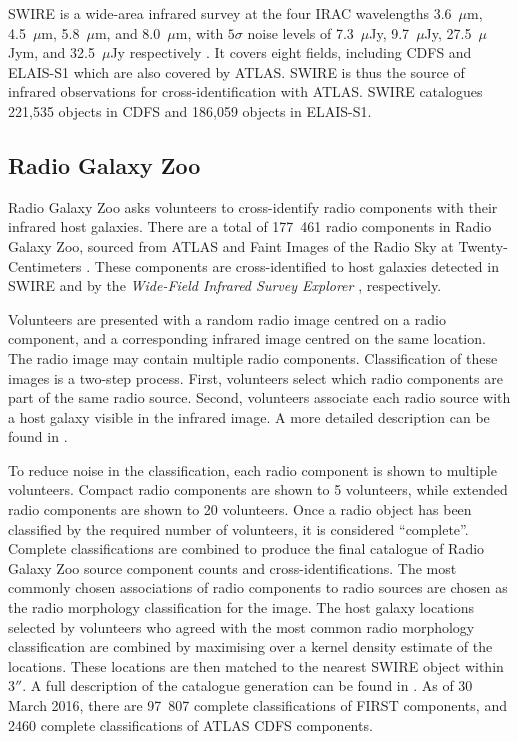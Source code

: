 \documentclass[fleqn,usenatbib,usedcolumn]{mnras}
\begin{document}
    SWIRE \citep{lonsdale03swire, surace05swire} is a wide-area infrared survey
    at the four IRAC wavelengths 3.6~$\mu$m, 4.5~$\mu$m, 5.8~$\mu$m, and
    8.0~$\mu$m, with $5\sigma$ noise levels of 7.3~$\mu$Jy, 9.7~$\mu$Jy,
    27.5~$\mu$Jym, and 32.5~$\mu$Jy respectively \citep{lonsdale03swire}. It
    covers eight fields, including CDFS and ELAIS-S1 which are also covered by
    ATLAS. SWIRE is thus the source of infrared observations for
    cross-identification with ATLAS. SWIRE catalogues 221,535 objects in CDFS
    and 186,059 objects in ELAIS-S1.

  \subsection{Radio Galaxy Zoo}\label{sec:rgz}

    Radio Galaxy Zoo asks volunteers to cross-identify radio components with
    their infrared host galaxies. There are a total of 177~461 radio components
    in Radio Galaxy Zoo, sourced from ATLAS and Faint Images of the Radio Sky at
    Twenty-Centimeters \citep[FIRST;][]{white97first}. These components are
    cross-identified to host galaxies detected in SWIRE and by the
    \emph{Wide-Field Infrared Survey Explorer} \citep[WISE;][]{wright10wise},
    respectively.

    Volunteers are presented with a random radio image centred on a radio
    component, and a corresponding infrared image centred on the same
    location. The radio image may contain multiple radio components.
    Classification of these images is a two-step process. First, volunteers
    select which radio components are part of the same radio source. Second,
    volunteers associate each radio source with a host galaxy visible in the
    infrared image. A more detailed description can be found in
    \citet{banfield15}.

    To reduce noise in the classification, each radio component is shown to
    multiple volunteers. Compact radio components are shown to 5 volunteers,
    while extended radio components are shown to 20 volunteers. Once a radio
    object has been classified by the required number of volunteers, it is
    considered ``complete''. Complete classifications are combined to produce
    the final catalogue of Radio Galaxy Zoo source component counts and
    cross-identifications. The most commonly chosen associations of radio
    components to radio sources are chosen as the radio morphology
    classification for the image. The host galaxy locations selected by
    volunteers who agreed with the most common radio morphology classification
    are combined by maximising over a kernel density estimate of the locations.
    These locations are then matched to the nearest SWIRE object within $3''$. A
    full description of the catalogue generation can be found in \citet{wong17}.
    As of 30 March 2016, there are 97~807 complete classifications of FIRST
    components, and 2460 complete classifications of ATLAS CDFS components.
\end{document}
